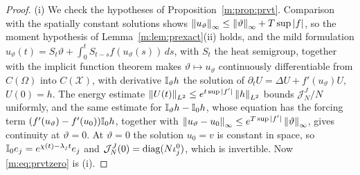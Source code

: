 \begin{proof}
(i) We check the hypotheses of Proposition~\ref{m:prop:prvt}. Comparison with the spatially constant solutions shows $\left\|u_\vartheta\right\|_\infty\le\left\|\vartheta\right\|_\infty+T\sup|f|$, so the moment hypothesis of Lemma~\ref{m:lem:prexact}(ii) holds, and the mild formulation $u_\vartheta(t)=S_t\vartheta+\int_0^tS_{t-s}f(u_\vartheta(s))\,ds$, with $S_t$ the heat semigroup, together with the implicit function theorem makes $\vartheta\mapsto u_\vartheta$ continuously differentiable from $C(\Omega)$ into $C(\mathcal X)$, with derivative $\mathbb{I}_\vartheta h$ the solution of $\partial_tU=\Delta U+f'(u_\vartheta)U$, $U(0)=h$. The energy estimate $\left\|U(t)\right\|_{L^2}\le e^{t\sup|f'|}\left\|h\right\|_{L^2}$ bounds $\mathcal J^J_N/N$ uniformly, and the same estimate for $\mathbb{I}_\vartheta h-\mathbb{I}_0h$, whose equation has the forcing term $(f'(u_\vartheta)-f'(u_0))\mathbb{I}_0h$, together with $\left\|u_\vartheta-u_0\right\|_\infty\le e^{T\sup|f'|}\left\|\vartheta\right\|_\infty$, gives continuity at $\vartheta=0$. At $\vartheta=0$ the solution $u_0=v$ is constant in space, so $\mathbb{I}_0e_j=e^{\chi(t)-\lambda_jt}e_j$ and $\mathcal J^J_N(0)=\operatorname{diag}(N\iota^0_j)$, which is invertible. Now \eqref{m:eq:prvtzero} is (i).


\end{proof}

